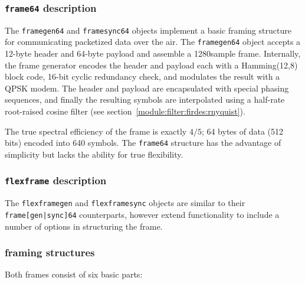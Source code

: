 \subsubsection{{\tt frame64} description}
\label{module:framing:frames:frame64}
The {\tt framegen64} and {\tt framesync64} objects implement a basic framing
structure for communicating packetized data over the air.
The {\tt framegen64} object accepts a 12-byte header and 64-byte payload and
assemble a 1280sample frame.
Internally, the frame generator encodes the header and payload each with a
Hamming(12,8) block code, 16-bit cyclic redundancy check, and modulates the
result with a QPSK modem.
The header and payload are encapsulated with special phasing sequences, and
finally the resulting symbols are interpolated using a half-rate root-raised
cosine filter (see section~\ref{module:filter:firdes:rnyquist}).

The true spectral efficiency of the frame is exactly $4/5$; 64 bytes of data
(512 bits) encoded into 640 symbols.
The {\tt frame64} structure has the advantage of simplicity but lacks the
ability for true flexibility.

\subsubsection{{\tt flexframe} description}
\label{module:framing:frames:flexframe}
The {\tt flexframegen} and {\tt flexframesync} objects are similar to their
{\tt frame[gen|sync]64} counterparts, however extend functionality to include
a number of options in structuring the frame.

\subsubsection{framing structures}
\label{module:framing:frames:structures}
Both frames consist of six basic parts:


